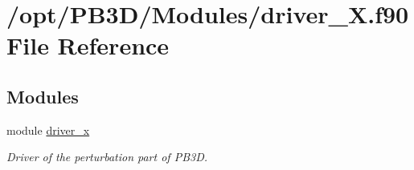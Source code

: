 \hypertarget{driver__X_8f90}{}\section{/opt/\+P\+B3\+D/\+Modules/driver\+\_\+X.f90 File Reference}
\label{driver__X_8f90}
\subsection*{Modules}
\begin{DoxyCompactItemize}
\item 
module \hyperlink{namespacedriver__x}{driver\+\_\+x}
\begin{DoxyCompactList}\small\item\em Driver of the perturbation part of P\+B3D. \end{DoxyCompactList}\end{DoxyCompactItemize}
